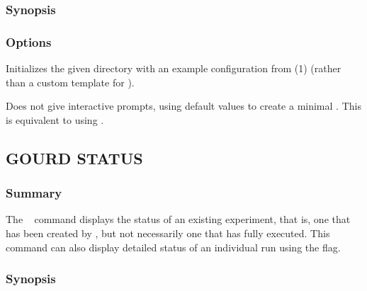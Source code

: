 \documentclass[a4paper,english]{article}
\begin{document}
\begin{adjustwidth}{18pt}{0pt}
            \subsubsection{Synopsis}
                 

            \subsubsection{Options}
                \begin{Description}[Options]
                \item[\OptArg{-e, --example}{ example-name}]
                Initializes the given directory with an example configuration from (1)
                (rather than a custom template for ).
                \item[\Opt{-q, --quick}]
                Does not give interactive prompts, using default values to create a minimal .
                This is equivalent to using .
                \end{Description}

        \subsection{GOURD STATUS}

            \subsubsection{Summary}
                The ~ command displays the status of an existing experiment,
                that is, one that has been created by  , but not necessarily
                one that has fully executed.
                This command can also display detailed status of an individual run using the  flag.

            \subsubsection{Synopsis}


\end{adjustwidth}
\end{document}

